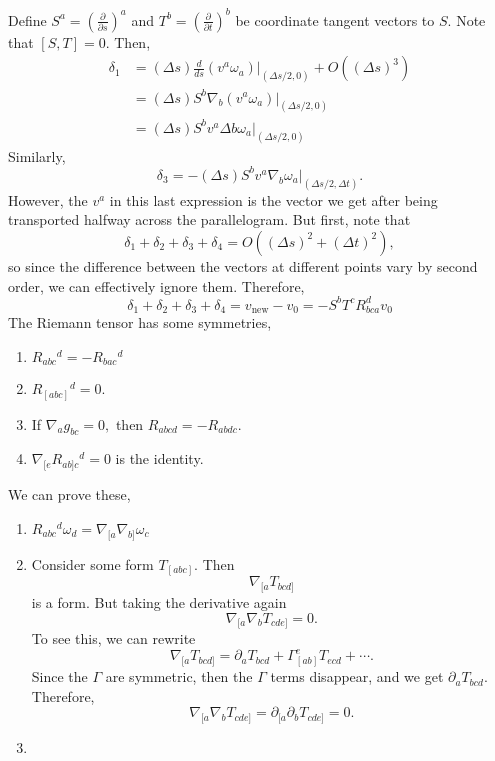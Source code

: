 \documentclass{article}
\numberwithin{equation}{section}
\begin{document}
Define $S^a = \left(\frac{\partial}{\partial s}\right)^a$ and $T^b = \left(\frac{\partial}{\partial t}\right)^b$ be coordinate tangent vectors to $S.$ Note that $[S,T]=0.$ Then,
\begin{align*}
    \delta_1 &= (\Delta s) \frac{d}{ds}(v^a\omega_a)\bigg|_{(\Delta s/2, 0)} + O((\Delta s)^3) \\ 
    &= (\Delta s) S^b\nabla_b (v^a\omega_a)\bigg|_{(\Delta s/2, 0)}  \\ 
    &= (\Delta s)S^b v^a \Delta b \omega_a\bigg|_{(\Delta s/2, 0)} 
\end{align*}
Similarly,
\begin{equation*}
    \delta_3 = -(\Delta s)S^b v^a\nabla_b\omega_a\bigg|_{(\Delta s/2, \Delta t)}.
\end{equation*}
However, the $v^a$ in this last expression is the vector we get after being transported halfway across the parallelogram. But first, note that
\begin{equation*}
    \delta_1+\delta_2+\delta_3+\delta_4 = O((\Delta s)^2 + (\Delta t)^2),
\end{equation*}
so since the difference between the vectors at different points vary by second order, we can effectively ignore them. Therefore, 
\begin{equation*}
    \delta_1+\delta_2+\delta_3+\delta_4 = v_\text{new} - v_0 = -S^bT^cR_{bca}^dv_0%
\end{equation*}
The Riemann tensor has some symmetries,
\begin{enumerate}
    \item $R_{abc}{}^d=-R_{bac}{}^d$
    \item $R_{[abc]}{}^d=0.$
    \item If $\nabla_a g_{bc} = 0,$ then $R_{abcd}=-R_{abdc}.$
    \item $\nabla_{[e}R_{ab]c}{}^d = 0$ is the  identity.
\end{enumerate}
We can prove these,
\begin{enumerate}
    \item $R_{abc}{}^d\omega_d = \nabla_{[a}\nabla_{b]}\omega_c$
    \item Consider some form $T_{[abc]}.$ Then
    \begin{equation*}
        \nabla_{[a}T_{bcd]}
    \end{equation*}
    is a form. But taking the derivative again 
    \begin{equation*}
        \nabla_{[a}\nabla_bT_{cde]} = 0.
    \end{equation*}
    To see this, we can rewrite 
    \begin{equation*}
        \nabla_{[a} T_{bcd]} = \partial_a T_{bcd} + \Gamma_{[ab]}^{e}T_{ecd} + \cdots.
    \end{equation*}
    Since the $\Gamma$ are symmetric, then the $\Gamma$ terms disappear, and we get $\partial_a T_{bcd}.$ Therefore,
    \begin{equation*}
        \nabla_{[a}\nabla_bT_{cde]} = \partial_{[a}\partial_bT_{cde]} = 0.
    \end{equation*}
    \item 
\end{enumerate}
\end{document}

